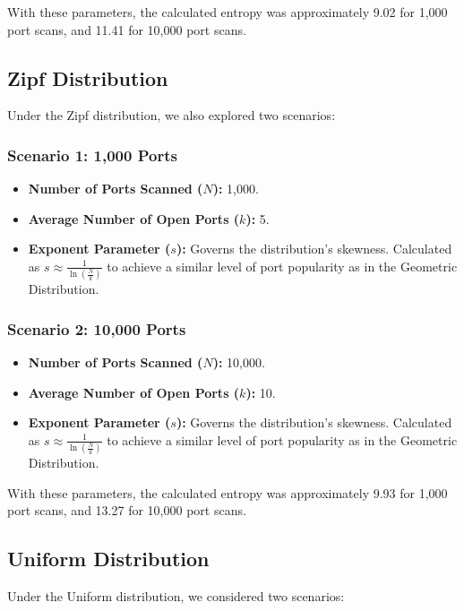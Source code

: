 With these parameters, the calculated entropy was approximately 9.02 for 1,000 port scans, and 11.41 for 10,000 port scans.

\subsection{Zipf Distribution}

Under the Zipf distribution, we also explored two scenarios:

\subsubsection{Scenario 1: 1,000 Ports}

\begin{itemize}
\item \textbf{Number of Ports Scanned (\(N\)):} 1,000.
\item \textbf{Average Number of Open Ports (\(k\)):} 5.
\item \textbf{Exponent Parameter (\(s\)):} Governs the distribution's skewness. Calculated as \(s \approx \frac{1}{\ln(\frac{N}{k})}\) to achieve a similar level of port popularity as in the Geometric Distribution.
\end{itemize}

\subsubsection{Scenario 2: 10,000 Ports}

\begin{itemize}
\item \textbf{Number of Ports Scanned (\(N\)):} 10,000.
\item \textbf{Average Number of Open Ports (\(k\)):} 10.
\item \textbf{Exponent Parameter (\(s\)):} Governs the distribution's skewness. Calculated as \(s \approx \frac{1}{\ln(\frac{N}{k})}\) to achieve a similar level of port popularity as in the Geometric Distribution.
\end{itemize}

With these parameters, the calculated entropy was approximately 9.93 for 1,000 port scans, and 13.27 for 10,000 port scans.


\subsection{Uniform Distribution}

Under the Uniform distribution, we considered two scenarios:

